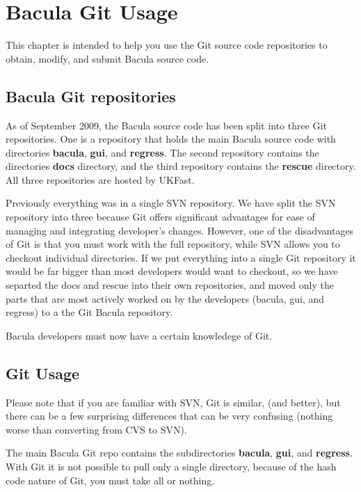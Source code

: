 \chapter{Bacula Git Usage}
\label{_GitChapterStart}

This chapter is intended to help you use the Git source code
repositories to obtain, modify, and submit Bacula source code.


\section{Bacula Git repositories}
As of September 2009, the Bacula source code has been split into
three Git repositories.  One is a repository that holds the
main Bacula source code with directories {\bf bacula}, {\bf gui},
and {\bf regress}.  The second repository contains
the directories {\bf docs} directory, and the third repository
contains the {\bf rescue} directory. All three repositories are 
hosted by UKFast.

Previously everything was in a single SVN repository.
We have split the SVN repository into three because Git
offers significant advantages for ease of managing and integrating
developer's changes.  However, one of the disadvantages of Git is that you
must work with the full repository, while SVN allows you to checkout
individual directories.  If we put everything into a single Git
repository it would be far bigger than most developers would want
to checkout, so we have separted the docs and rescue into their own
repositories, and moved only the parts that are most actively 
worked on by the developers (bacula, gui, and regress) to a the
Git Bacula repository.  

Bacula developers must now have a certain knowledege of Git.

\section{Git Usage}

Please note that if you are familiar with SVN, Git is similar,
(and better), but there can be a few surprising differences that
can be very confusing (nothing worse than converting from CVS to SVN).

The main Bacula Git repo contains the subdirectories {\bf bacula}, {\bf gui},
and {\bf regress}. With Git it is not possible to pull only a
single directory, because of the hash code nature of Git, you
must take all or nothing.

